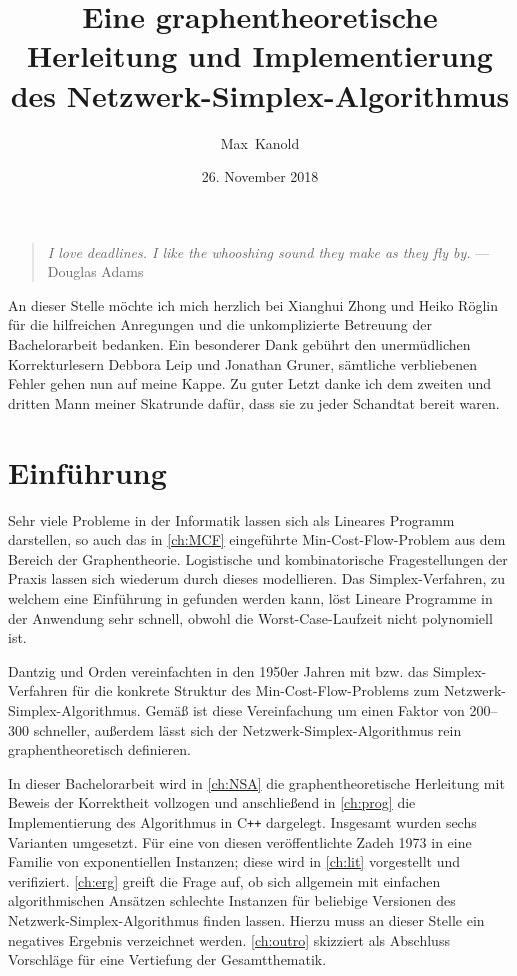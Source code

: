 \documentclass[11pt,a4paper,twoside,ngerman,openany,bibliography=totoc]{scrbook}
\author{Max~Kanold}
\date{26. November 2018}
\title{Eine graphentheoretische Herleitung und Implementierung des Netzwerk-Simplex-Algorithmus}
\theoremstyle{plain}
\theoremstyle{definition}
\newcommand{\cpp}{C\texttt{++}\xspace}
\begin{document}
\frontmatter
\maketitle
\null\vfill
\begin{quote}
    \emph{I love deadlines. I like the whooshing sound they make as they fly by.}
    \flushright --- Douglas Adams
\end{quote}
\vfill\vfill\vfill
An dieser Stelle möchte ich mich herzlich bei Xianghui Zhong und Heiko Röglin für die hilfreichen Anregungen und die unkomplizierte Betreuung der Bachelorarbeit bedanken. Ein besonderer Dank gebührt den unermüdlichen Korrekturlesern Debbora Leip und Jonathan Gruner, sämtliche verbliebenen Fehler gehen nun auf meine Kappe. Zu guter Letzt danke ich dem zweiten und dritten Mann meiner Skatrunde dafür, dass sie zu jeder Schandtat bereit waren.
\thispagestyle{empty}
\clearpage

\tableofcontents
\thispagestyle{empty}
\cleardoublepage

\mainmatter
\chapter{Einführung}
Sehr viele Probleme in der Informatik lassen sich als Lineares Programm darstellen, so auch das in \cref{ch:MCF} eingeführte Min-Cost-Flow-Problem aus dem Bereich der Graphentheorie. Logistische und kombinatorische Fragestellungen der Praxis lassen sich wiederum durch dieses modellieren. Das Simplex-Verfahren, zu welchem eine Einführung in \cite{NSAbook} gefunden werden kann, löst Lineare Programme in der Anwendung sehr schnell, obwohl die Worst-Case-Laufzeit nicht polynomiell ist. 

Dantzig und Orden vereinfachten in den 1950er Jahren mit \cite{erf1} bzw. \cite{erf2} das Simplex-Verfahren für die konkrete Struktur des Min-Cost-Flow-Problems zum Netzwerk-Simplex-Algorithmus. Gemäß \cite[S. 445]{LP&NF2010} ist diese Vereinfachung um einen Faktor von 200--300 schneller, außerdem lässt sich der Netzwerk-Simplex-Algorithmus rein graphentheoretisch definieren.

In dieser Bachelorarbeit wird in \cref{ch:NSA} die graphentheoretische Herleitung mit Beweis der Korrektheit vollzogen und anschließend in \cref{ch:prog} die Implementierung des Algorithmus in \cpp dargelegt. Insgesamt wurden sechs Varianten umgesetzt. Für eine von diesen veröffentlichte Zadeh 1973 in \cite{Exponential} eine Familie von exponentiellen Instanzen; diese wird in \cref{ch:lit} vorgestellt und verifiziert. \cref{ch:erg} greift die Frage auf, ob sich allgemein mit einfachen algorithmischen Ansätzen schlechte Instanzen für beliebige Versionen des Netzwerk-Simplex-Algorithmus finden lassen. Hierzu muss an dieser Stelle ein negatives Ergebnis verzeichnet werden. \cref{ch:outro} skizziert als Abschluss Vorschläge für eine Vertiefung der Gesamtthematik.
\end{document}
